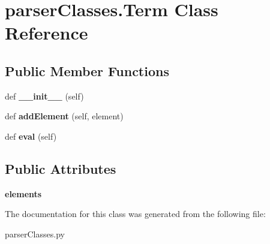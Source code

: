 \hypertarget{classparser_classes_1_1_term}{}\section{parser\+Classes.\+Term Class Reference}
\label{classparser_classes_1_1_term}
\subsection*{Public Member Functions}
\begin{DoxyCompactItemize}
\item 
def {\bfseries \+\_\+\+\_\+init\+\_\+\+\_\+} (self)\hypertarget{classparser_classes_1_1_term_a6c4e5a1df9a4e150418f70d649bb0ccf}{}\label{classparser_classes_1_1_term_a6c4e5a1df9a4e150418f70d649bb0ccf}

\item 
def {\bfseries add\+Element} (self, element)\hypertarget{classparser_classes_1_1_term_a61959371502fbe2ff800e1c105cc12aa}{}\label{classparser_classes_1_1_term_a61959371502fbe2ff800e1c105cc12aa}

\item 
def {\bfseries eval} (self)\hypertarget{classparser_classes_1_1_term_a59507b1f0f91fc82f9c152ee33a89251}{}\label{classparser_classes_1_1_term_a59507b1f0f91fc82f9c152ee33a89251}

\end{DoxyCompactItemize}
\subsection*{Public Attributes}
\begin{DoxyCompactItemize}
\item 
{\bfseries elements}\hypertarget{classparser_classes_1_1_term_ac347a45be39cbf864849da398d22d2d2}{}\label{classparser_classes_1_1_term_ac347a45be39cbf864849da398d22d2d2}

\end{DoxyCompactItemize}


The documentation for this class was generated from the following file\+:\begin{DoxyCompactItemize}
\item 
parser\+Classes.\+py\end{DoxyCompactItemize}
